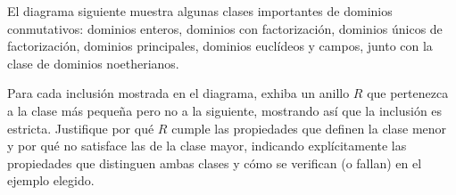 \begin{ejer}
El diagrama siguiente muestra algunas clases importantes de dominios conmutativos: dominios enteros, dominios con factorización, dominios únicos de factorización, dominios principales, dominios euclídeos y campos, junto con la clase de dominios noetherianos.

Para cada inclusión mostrada en el diagrama, exhiba un anillo $R$ que pertenezca a la clase más pequeña pero no a la siguiente, mostrando así que la inclusión es estricta. Justifique por qué $R$ cumple las propiedades que definen la clase menor y por qué no satisface las de la clase mayor, indicando explícitamente las propiedades que distinguen ambas clases y cómo se verifican (o fallan) en el ejemplo elegido.
\end{ejer}
